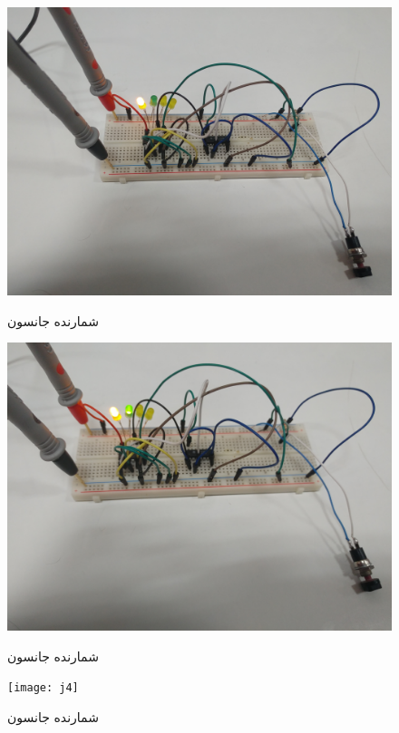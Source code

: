 \documentclass[twoside]{article}
\begin{document}
	\begin{figure}[h!]
		\begin{center}
			\includegraphics[scale=0.05]{j2}‎
			\caption{شمارنده جانسون}
		\end{center}
	\end{figure} 

	\begin{figure}[h!]
		\begin{center}
			\includegraphics[scale=0.05]{j3}‎
			\caption{شمارنده جانسون}
		\end{center}
	\end{figure} 
	
	\begin{figure}[h!]
		\begin{center}
			\texttt{[image: j4]}‎
			\caption{شمارنده جانسون}
		\end{center}
	\end{figure} 
	
\end{document}
